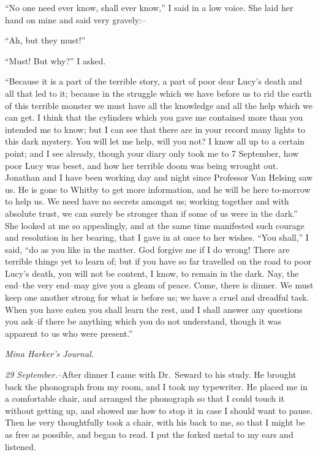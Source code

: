 \documentclass[12pt,openright]{book}
\begin{document}
“No one need ever know, shall ever know,” I said in a low voice. She laid her hand on mine and said very gravely:–

“Ah, but they must!”

“Must! But why?” I asked.

“Because it is a part of the terrible story, a part of poor dear Lucy’s death and all that led to it; because in the struggle which we have before us to rid the earth of this terrible monster we must have all the knowledge and all the help which we can get. I think that the cylinders which you gave me contained more than you intended me to know; but I can see that there are in your record many lights to this dark mystery. You will let me help, will you not? I know all up to a certain point; and I see already, though your diary only took me to 7 September, how poor Lucy was beset, and how her terrible doom was being wrought out. Jonathan and I have been working day and night since Professor Van Helsing saw us. He is gone to Whitby to get more information, and he will be here to-morrow to help us. We need have no secrets amongst us; working together and with absolute trust, we can surely be stronger than if some of us were in the dark.” She looked at me so appealingly, and at the same time manifested such courage and resolution in her bearing, that I gave in at once to her wishes. “You shall,” I said, “do as you like in the matter. God forgive me if I do wrong! There are terrible things yet to learn of; but if you have so far travelled on the road to poor Lucy’s death, you will not be content, I know, to remain in the dark. Nay, the end–the very end–may give you a gleam of peace. Come, there is dinner. We must keep one another strong for what is before us; we have a cruel and dreadful task. When you have eaten you shall learn the rest, and I shall answer any questions you ask–if there be anything which you do not understand, though it was apparent to us who were present.”

\textit{Mina Harker’s Journal.}

\textit{29 September.}–After dinner I came with Dr. Seward to his study. He brought back the phonograph from my room, and I took my typewriter. He placed me in a comfortable chair, and arranged the phonograph so that I could touch it without getting up, and showed me how to stop it in case I should want to pause. Then he very thoughtfully took a chair, with his back to me, so that I might be as free as possible, and began to read. I put the forked metal to my ears and listened.
\end{document}
